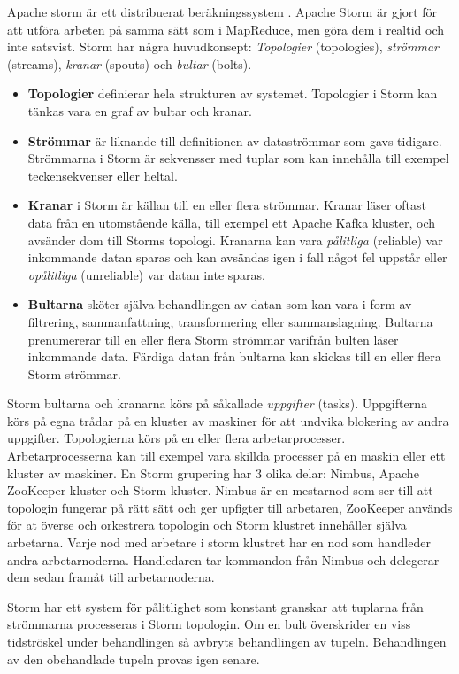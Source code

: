 Apache storm är ett distribuerat beräkningssystem \citep{apachestorm}. Apache Storm är gjort för att utföra arbeten
på samma sätt som i MapReduce, men göra dem i realtid och inte satsvist. Storm har några huvudkonsept: \textit{Topologier} (topologies),
\textit{strömmar} (streams), \textit{kranar} (spouts) och \textit{bultar} (bolts).
\begin{itemize}
    \item \textbf{Topologier} definierar hela strukturen av systemet. Topologier i Storm kan tänkas vara en graf av bultar och kranar.
    \item \textbf{Strömmar} är liknande till definitionen av dataströmmar som gavs tidigare. Strömmarna i Storm är sekvensser med tuplar som kan innehålla till exempel teckensekvenser eller heltal.
    \item \textbf{Kranar} i Storm är källan till en
eller flera strömmar. Kranar läser oftast data från en utomstående källa, till exempel ett Apache Kafka kluster, och avsänder dom till Storms topologi. Kranarna kan vara 
\textit{pålitliga} (reliable) var inkommande datan sparas och kan avsändas igen i fall något fel uppstår eller \textit{opålitliga} (unreliable)
var datan inte sparas.
   \item \textbf{Bultarna} sköter själva behandlingen av datan som kan vara i form av filtrering, sammanfattning, transformering 
eller sammanslagning. Bultarna prenumererar till en eller flera Storm strömmar varifrån bulten läser inkommande data. Färdiga datan från
bultarna kan skickas till en eller flera Storm strömmar.
\end{itemize}

Storm bultarna och kranarna körs på såkallade \textit{uppgifter} (tasks). Uppgifterna körs på egna trådar på en kluster av maskiner 
för att undvika blokering av andra uppgifter. Topologierna körs på en eller flera arbetarprocesser. Arbetarprocesserna kan till exempel vara
skillda processer på en maskin eller ett kluster av maskiner. En Storm grupering har 3 olika delar\citep{marz2013big}: Nimbus, Apache ZooKeeper 
kluster och Storm kluster. Nimbus är en mestarnod som ser till att topologin fungerar på rätt sätt och ger upfigter till arbetaren, ZooKeeper
används för at överse och orkestrera topologin och Storm klustret innehåller själva arbetarna. Varje nod med arbetare i storm klustret har en nod
som handleder andra arbetarnoderna. Handledaren tar kommandon från Nimbus och delegerar dem sedan framåt till arbetarnoderna.

Storm har ett system för pålitlighet som konstant granskar att tuplarna från strömmarna processeras i Storm topologin. Om en bult överskrider en
viss tidströskel under behandlingen så avbryts behandlingen av tupeln. Behandlingen av den obehandlade tupeln provas igen senare.

